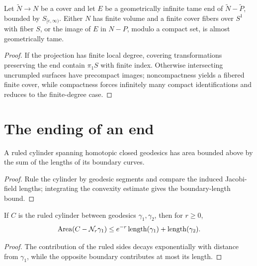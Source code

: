 \begin{theorem}
\label{thurston-ch09-covering-restriction}
 Let $\widetilde N\to N$ be a cover and let $E$ be a geometrically infinite tame end of $\widetilde N-\widetilde P$, bounded by $S_{[e,\infty)}$. Either $N$ has finite volume and a finite cover fibers over $S^1$ with fiber $S$, or the image of $E$ in $N-P$, modulo a compact set, is almost geometrically tame.
\end{theorem}
\begin{proof}\sketch If the projection has finite local degree, covering transformations preserving the end contain $\pi_1S$ with finite index. Otherwise intersecting uncrumpled surfaces have precompact images; noncompactness yields a fibered finite cover, while compactness forces infinitely many compact identifications and reduces to the finite-degree case.\end{proof}

\section{The ending of an end}

\begin{theorem}
\label{thurston-ch09-ruled-cylinder-area}
 A ruled cylinder spanning homotopic closed geodesics has area bounded above by the sum of the lengths of its boundary curves.
\end{theorem}
\begin{proof}\sketch Rule the cylinder by geodesic segments and compare the induced Jacobi-field lengths; integrating the convexity estimate gives the boundary-length bound.\end{proof}

\begin{theorem}
\label{thurston-ch09-truncated-cylinder-area}
 If $C$ is the ruled cylinder between geodesics $\gamma_1,\gamma_2$, then for $r\ge0$,
\[
 \operatorname{Area}(C-\mathcal N_r\gamma_1)\le e^{-r}\operatorname{length}(\gamma_1)+\operatorname{length}(\gamma_2).
\]
\end{theorem}
\begin{proof}\sketch The contribution of the ruled sides decays exponentially with distance from $\gamma_1$, while the opposite boundary contributes at most its length.\end{proof}

